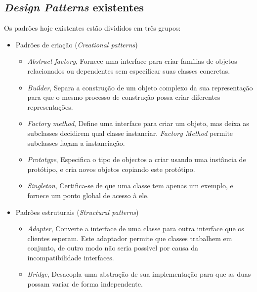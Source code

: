 \subsection{\emph{Design Patterns} existentes}
\label{sub:designexistentes}


Os padrões hoje existentes estão divididos em três grupos:\cite{gamma95}

\begin{itemize}
	\item
		Padrões de criação (\emph{Creational patterns}) \\

		\begin{itemize}
			\item 
				\emph{Abstract factory}, Fornece uma interface para criar famílias de objetos relacionados ou dependentes sem especificar suas classes concretas.\\

			\item 
				\emph{Builder}, Separa a construção de um objeto complexo da sua representação para que
o mesmo processo de construção possa criar diferentes representações.\\
			\item 
				\emph{Factory method}, Define uma interface para criar um objeto, mas deixa as subclasses decidirem qual classe instanciar. \emph{Factory Method} permite subclasses façam a instanciação.\\

			\item 
				\emph{Prototype}, Especifica o tipo de objectos a criar usando uma instância de protótipo, e cria
novos objetos copiando este protótipo.\\

			\item 
				\emph{Singleton}, Certifica-se de que uma classe tem apenas um exemplo, e fornece um ponto global de acesso à ele.\\

		\end{itemize}

	\item
		Padrões estruturais (\emph{Structural patterns})\\
		
		\begin{itemize}
			\item \emph{Adapter}, Converte a interface de uma classe para outra interface que os clientes esperam. Este adaptador permite que classes trabalhem em conjunto, de outro modo não seria possivel por causa da incompatibilidade
interfaces.  \\
			\item \emph{Bridge}, Desacopla uma abstração de sua implementação para que as duas possam variar
de forma independente.\\


\end{itemize}
\end{itemize}
